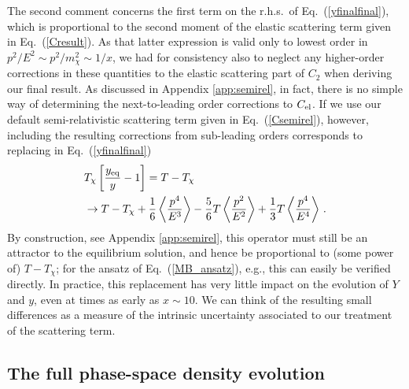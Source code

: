 \documentclass[twocolumn,showpacs,amsmath,amssymb,superscriptaddress,nofootinbib]{revtex4-1}
\begin{document}
The second comment concerns the first term
on the r.h.s.~of Eq.~(\ref{yfinalfinal}), which is proportional to the second moment of the 
elastic scattering term given in Eq.~(\ref{Cresult}). As that latter expression is valid only to lowest 
order in $p^2/E^2\sim p^2/m_\chi^2\sim 1/x$, we had for consistency also to neglect any higher-order 
corrections in these quantities to the elastic scattering part of $C_2$ when deriving our final result.
As discussed in Appendix  \ref{app:semirel}, in fact, there is no simple way of determining the 
next-to-leading order corrections to $C_{\rm el}$. If we use our default semi-relativistic 
scattering term given in Eq.~(\ref{Csemirel}), however, including the resulting corrections from sub-leading
orders corresponds to replacing in Eq.~(\ref{yfinalfinal})
\begin{align}
\label{gamma_semirel}
&T_\chi \left[\frac{y_{{\rm eq}}}{y} -1\right]=T-T_\chi\\
&\to 
T-T_\chi+\frac16\left\langle \frac{p^4}{E^3}\right\rangle
-\frac56T\left\langle \frac{p^2}{E^2}\right\rangle+\frac13T\left\langle \frac{p^4}{E^4}\right\rangle\,.\nonumber
\end{align}
By construction, see Appendix  \ref{app:semirel}, this operator must still be an attractor to the
equilibrium solution, and hence be proportional to (some power of) $T-T_\chi$; for the ansatz of 
Eq.~(\ref{MB_ansatz}), e.g., this can easily be verified directly.
In practice, this replacement has very little impact on the evolution of $Y$ and $y$, even at times as 
early as $x\sim10$. We can think of the resulting small differences as a measure of the intrinsic uncertainty 
associated to our treatment of the scattering term.



\subsection{The full phase-space density evolution}
\label{sec:magicmichael}
\end{document}
